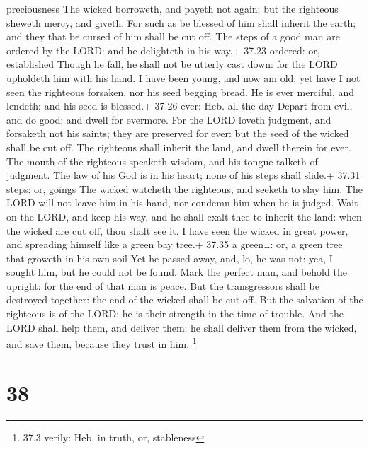 preciousness  The wicked borroweth, and payeth not again:
but the righteous sheweth mercy, and giveth.  For such as
be blessed of him shall inherit the earth; and they that be cursed of
him shall be cut off.  The steps of a good man are ordered
by the LORD: and he delighteth in his way.+ 37.23 ordered: or,
established  Though he fall, he shall not be utterly cast
down: for the LORD upholdeth him with his hand.  I have
been young, and now am old; yet have I not seen the righteous forsaken,
nor his seed begging bread.  He is ever merciful, and
lendeth; and his seed is blessed.+ 37.26 ever: Heb. all the day
 Depart from evil, and do good; and dwell for evermore.
 For the LORD loveth judgment, and forsaketh not his
saints; they are preserved for ever: but the seed of the wicked shall be
cut off.  The righteous shall inherit the land, and dwell
therein for ever.  The mouth of the righteous speaketh
wisdom, and his tongue talketh of judgment.  The law of his
God is in his heart; none of his steps shall slide.+ 37.31 steps: or,
goings  The wicked watcheth the righteous, and seeketh to
slay him.  The LORD will not leave him in his hand, nor
condemn him when he is judged.  Wait on the LORD, and keep
his way, and he shall exalt thee to inherit the land: when the wicked
are cut off, thou shalt see it.  I have seen the wicked in
great power, and spreading himself like a green bay tree.+ 37.35 a
green\ldots: or, a green tree that groweth in his own soil 
Yet he passed away, and, lo, he was not: yea, I sought him, but he could
not be found.  Mark the perfect man, and behold the
upright: for the end of that man is peace.  But the
transgressors shall be destroyed together: the end of the wicked shall
be cut off.  But the salvation of the righteous is of the
LORD: he is their strength in the time of trouble.  And the
LORD shall help them, and deliver them: he shall deliver them from the
wicked, and save them, because they trust in him. \footnote{37.3 verily:
  Heb. in truth, or, stableness}

\hypertarget{section-37}{%
\section{38}\label{section-37}}

